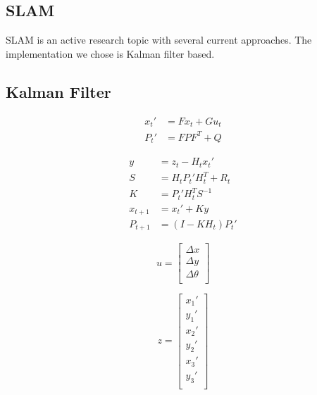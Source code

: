 \documentclass[prodmode,acmtecs]{acmsmall} %
\begin{document}
\subsection{SLAM}

SLAM is an active research topic with several current approaches.  The implementation we chose is Kalman filter based.

\subsection{Kalman Filter}

\begin{align*}
    x_t' &= F x_t + G u_t \\
    P_t' &= F P F^T + Q
\end{align*}

\begin{align*}
    y &= z_t - H_t x_t' \\
    S &= H_t P_t' H^T_t + R_t \\
    K &= P_t' H^T_t S^{-1} \\
    x_{t+1} &= x_t' + Ky \\
    P_{t+1} &= (I - K H_t) P_t'
\end{align*}

$$
u = 
\begin{bmatrix}
    \Delta x \\
    \Delta y \\
    \Delta \theta \\
\end{bmatrix}
$$

$$
z = 
\begin{bmatrix}
    x_1' \\
    y_1' \\
    x_2' \\
    y_2' \\
    x_3' \\
    y_3' \\
\end{bmatrix}
$$
\end{document}
